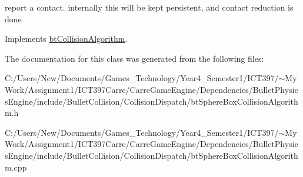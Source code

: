 report a contact. internally this will be kept persistent, and contact reduction is done 

Implements \hyperlink{classbt_collision_algorithm}{btCollisionAlgorithm}.

The documentation for this class was generated from the following files:\begin{CompactItemize}
\item 
C:/Users/New/Documents/Games\_\-Technology/Year4\_\-Semester1/ICT397/$\sim$My Work/Assignment1/ICT397Carre/CarreGameEngine/Dependencies/BulletPhysicsEngine/include/BulletCollision/CollisionDispatch/btSphereBoxCollisionAlgorithm.h\item 
C:/Users/New/Documents/Games\_\-Technology/Year4\_\-Semester1/ICT397/$\sim$My Work/Assignment1/ICT397Carre/CarreGameEngine/Dependencies/BulletPhysicsEngine/include/BulletCollision/CollisionDispatch/btSphereBoxCollisionAlgorithm.cpp\end{CompactItemize}
